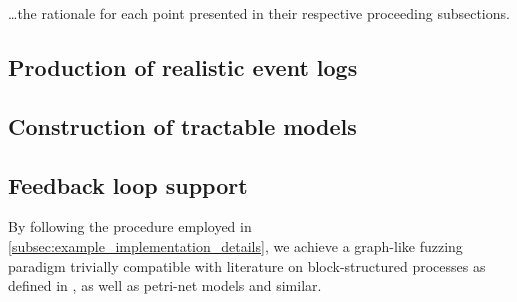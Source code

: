 \documentclass[12pt]{llncs}  %
\begin{document}
\ldots{}the rationale for each point presented in their respective proceeding
subsections.

\subsection{Production of realistic event logs}


\subsection{Construction of tractable models}


\subsection{Feedback loop support}



By following the procedure employed in
\cref{subsec:example_implementation_details}, we achieve a graph-like fuzzing
paradigm trivially compatible with literature on block-structured processes as
defined in \cite{li2010mining}, as well as petri-net models and similar.

\



\end{document}
